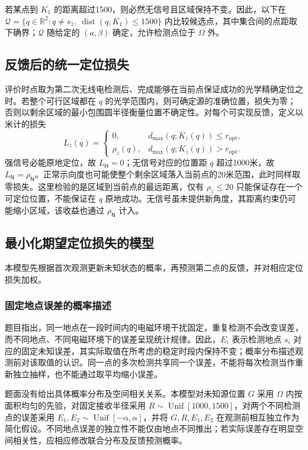 \documentclass[UTF8,a4paper,zihao=-4,fontset=none]{ctexart}
\begin{document}
若某点到 \(K_1\) 的距离超过1500，则必然无信号且区域保持不变。因此，以下在 \(\mathcal Q=\{q\in\mathbb R^2:q\ne s_1,\ \operatorname{dist}(q,K_1)\le1500\}\) 内比较候选点，其中集合间的点距取下确界；\(\mathcal Q\) 随给定的 \((a,\beta)\) 确定，允许检测点位于 \(\Omega\) 外。

\subsection{反馈后的统一定位损失}

评价时点取为第二次无线电检测后、完成能够在当前点保证成功的光学精确定位之时。若整个可行区域都在 \(q\) 的光学范围内，则可确定源的准确位置，损失为零；否则以剩余区域的最小包围圆半径衡量位置不确定性。对每个可实现反馈，定义以米计的损失
\begin{equation}
 L_z(q)=
 \begin{cases}
 0,&d_{\max}(q;K_z(q))\le r_{\mathrm{opt}},\\
 \rho_z(q),&d_{\max}(q;K_z(q))>r_{\mathrm{opt}}.
 \end{cases}
\label{eq:q2-pair-loss}
\end{equation}
强信号必能原地定位，故 \(L_{\mathsf H}=0\)；无信号对应的位置距 \(q\) 超过1000米，故 \(L_{\mathsf N}=\rho_{\mathsf N}\)。正常示向度也可能使整个剩余区域落入当前点的20米范围，此时同样取零损失。这里检验的是区域到当前点的最远距离，仅有 \(\rho_z\le20\) 只能保证存在一个可定位位置，不能保证在 \(q\) 原地成功。无信号虽未提供新角度，其距离约束仍可能缩小区域，该收益也通过 \(\rho_{\mathsf N}\) 计入。

\subsection{最小化期望定位损失的模型}

本模型先根据首次观测更新未知状态的概率，再预测第二点的反馈，并对相应定位损失加权。

\subsubsection{固定地点误差的概率描述}

题目指出，同一地点在一段时间内的电磁环境干扰固定，重复检测不会改变误差，而不同地点、不同电磁环境下的误差呈现统计规律。因此，\(E_i\) 表示检测地点 \(s_i\) 对应的固定未知误差，其实际取值在所考虑的稳定时段内保持不变；概率分布描述观测前对该取值的认识。同一点的多次检测共享同一个误差，不能将每次检测当作重新独立抽样，也不能通过取平均缩小误差。

题面没有给出具体概率分布及空间相关关系。本模型对未知源位置 \(G\) 采用 \(\Omega\) 内按面积均匀的先验，对固定接收半径采用 \(R\sim\operatorname{Unif}[1000,1500]\)，对两个不同检测点的误差采用 \(E_1,E_2\sim\operatorname{Unif}[-\alpha,\alpha]\)，并将 \(G,R,E_1,E_2\) 在观测前相互独立作为简化假设。不同地点误差的独立性不能仅由地点不同推出；若实际误差存在明显空间相关性，应相应修改联合分布及反馈预测概率。
\end{document}
